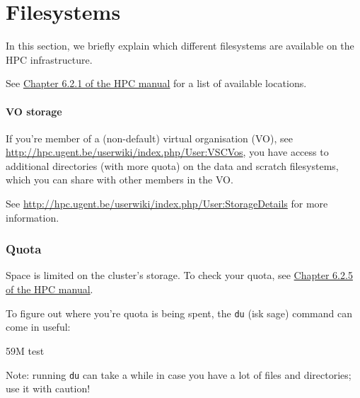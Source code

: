 \chapter{Filesystems}

In this section, we briefly explain which different filesystems are available on
the HPC infrastructure.

See \href{http://hpcugent.github.io/vsc_user_docs/pdf/intro-HPC-linux-gent.pdf#subsection.6.2.1}{Chapter 6.2.1 of the HPC manual}
for a list of available locations.

\subsubsection{VO storage}

If you're member of a (non-default) virtual organisation (VO), see
\url{http://hpc.ugent.be/userwiki/index.php/User:VSCVos}, you have access to
additional directories (with more quota) on the data and scratch filesystems,
which you can share with other members in the VO.

See \url{http://hpc.ugent.be/userwiki/index.php/User:StorageDetails} for more
information.

\subsection{Quota}

Space is limited on the cluster's storage. To check your quota, see
\href{http://hpcugent.github.io/vsc_user_docs/pdf/intro-HPC-linux-gent.pdf#subsection.6.2.5}{Chapter 6.2.5 of the HPC manual}.

To figure out where you're quota is being spent, the \verb|du| (isk sage)
command can come in useful:

\begin{prompt}
59M   test
\end{prompt}

Note: running \verb|du| can take a while in case you have a lot of files and
directories; use it with caution!
